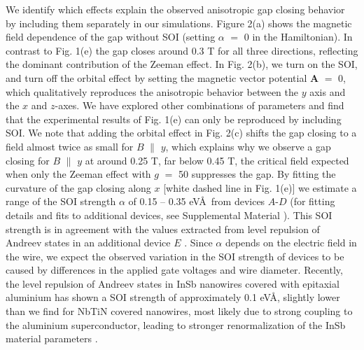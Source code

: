 We identify which effects explain the observed anisotropic gap closing behavior by including them separately in our simulations.
Figure 2(a) shows the magnetic field dependence of the gap without SOI (setting $\alpha$ $=$ 0 in the Hamiltonian).
In contrast to Fig. 1(e) the gap closes around 0.3 T for all three directions, reflecting the dominant contribution of the Zeeman effect.
In Fig. 2(b), we turn on the SOI, and turn off the orbital effect by setting the magnetic vector potential $\mathbf{A}$ $=$ 0, which qualitatively reproduces the anisotropic behavior between the $y$ axis and the $x$ and $z$-axes.
We have explored other combinations of parameters and find that the experimental results of Fig. 1(e) can only be reproduced by including SOI.
We note that adding the orbital effect in Fig. 2(c) shifts the gap closing to a field almost twice as small for $B$ $\parallel$ $y$, which explains why we observe a gap closing for $B$ $\parallel$ $y$ at around 0.25 T, far below 0.45 T, the critical field expected when only the Zeeman effect with $g$ $=$ 50 suppresses the gap.
By fitting the curvature of the gap closing \cite{VanHeck,Pan2018} along $x$ [white dashed line in Fig. 1(e)] we estimate a range of the SOI strength $\alpha$ of 0.15 -- 0.35 eV\AA\ from devices $A$-$D$ (for fitting details and fits to additional devices, see Supplemental Material \cite{Note1}).
This SOI strength is in \mbox{agreement} with the values extracted from level repulsion of Andreev states \cite{Stanescu2013,DeMoor2018} in an additional device $E$ \cite{Note1}.
\mbox{Since} $\alpha$ depends on the electric field in the wire, we expect the observed variation in the SOI strength of devices to be caused by differences in the applied gate voltages and wire diameter.
Recently, the level repulsion of Andreev states in InSb nanowires covered with epitaxial aluminium has shown a SOI strength of approximately 0.1 eV\AA \cite{DeMoor2018}, slightly lower than we find for NbTiN covered nanowires, most likely due to strong coupling to the aluminium superconductor, leading to stronger renormalization of the InSb material parameters \cite{Stanescu2011,Cole2015,Antipov2018,Woods2018,Mikkelsen2018,Reeg2018}.
